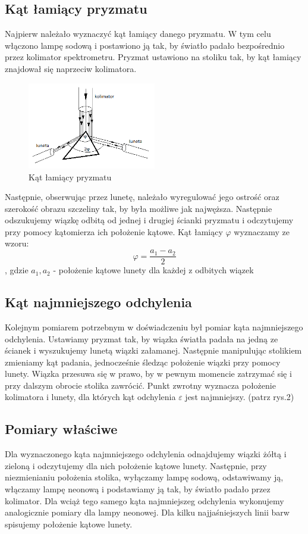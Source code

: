 \documentclass[a4paper,10pt]{article}
\begin{document}
\subsection{Kąt łamiący pryzmatu}
Najpierw należało wyznaczyć kąt łamiący danego pryzmatu. W tym celu włączono lampę sodową i postawiono ją tak, by światło padało bezpośrednio przez kolimator spektrometru. Pryzmat ustawiono na stoliku tak, by kąt łamiący znajdował się naprzeciw kolimatora. 
\begin{figure} [H]
  \centering
  \includegraphics[width=0.5\textwidth]{./phi.png}
  \caption{Kąt łamiący pryzmatu}
  \label{}
\end{figure}
Następnie, obserwując %
przez lunetę, należało wyregulować jego ostrość oraz szerokość obrazu szczeliny tak, by była możliwe jak najwęższa. Następnie odszukujemy wiązkę odbitą od jednej i drugiej ścianki pryzmatu i odczytujemy przy pomocy kątomierza ich położenie kątowe. Kąt łamiący $\varphi$ wyznaczamy ze wzoru:
\begin{equation}
\varphi = \frac{a_1 - a_2}{2}
\end{equation}
, gdzie $a_1, a_2$ - położenie kątowe lunety dla każdej z odbitych wiązek

\subsection{Kąt najmniejszego odchylenia}
Kolejnym pomiarem potrzebnym w doświadczeniu był pomiar kąta najmniejszego odchylenia. Ustawiamy pryzmat tak, by wiązka światła padała na jedną ze ścianek i wyszukujemy lunetą wiązki załamanej. Następnie manipulując stolikiem zmieniamy kąt padania, jednocześnie śledząc położenie wiązki przy pomocy lunety. Wiązka przesuwa się w prawo, by w pewnym momencie zatrzymać się i przy dalszym obrocie stolika zawrócić. Punkt zwrotny wyznacza położenie kolimatora i lunety, dla których kąt odchylenia $\varepsilon$ jest najmniejszy. (patrz rys.2)

\subsection{Pomiary właściwe}
Dla wyznaczonego kąta najmniejszego odchylenia odnajdujemy wiązki żółtą i zieloną i odczytujemy dla nich położenie kątowe lunety. Następnie, przy niezmienianiu położenia stolika, wyłączamy lampę sodową, odstawiwamy ją, włączamy lampę neonową i podstawiamy ją tak, by światło padało przez kolimator. Dla wciąż tego samego kąta najmniejszeg odchylenia wykonujemy analogicznie pomiary dla lampy neonowej. Dla kilku najjaśniejszych linii barw spisujemy położenie kątowe lunety.
\end{document}
